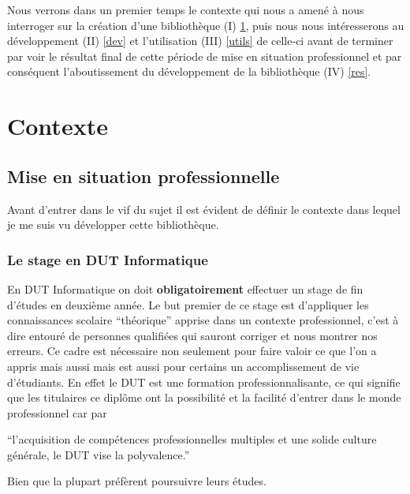 \documentclass[11pt,a4paper,krantz2,11pt,oneside]{krantz}
\renewenvironment{quote}{\begin{VF}}{\end{VF}}
\begin{document}
Nous verrons dans un premier temps le contexte qui nous a amené à nous interroger sur la création d'une bibliothèque (I) \ref{context}, puis nous nous intéresserons au développement (II) \ref{dev} et l'utilisation (III) \ref{utils} de celle-ci avant de terminer par voir le résultat final de cette période de mise en situation professionnel et par conséquent l'aboutissement du développement de la bibliothèque (IV) \ref{res}.

\hypertarget{context}{%
\chapter{Contexte}\label{context}}

\hypertarget{mise-en-situation-professionnelle}{%
\section{Mise en situation professionnelle}\label{mise-en-situation-professionnelle}}

Avant d'entrer dans le vif du sujet il est évident de définir le contexte dans lequel je me suis vu développer cette bibliothèque.

\hypertarget{le-stage-en-dut-informatique}{%
\subsection{Le stage en DUT Informatique}\label{le-stage-en-dut-informatique}}

En DUT Informatique on doit \textbf{obligatoirement} effectuer un stage de fin d'études en deuxième année. Le but premier de ce stage est d'appliquer les connaissances scolaire ``théorique'' apprise dans un contexte professionnel, c'est à dire entouré de personnes qualifiées qui sauront corriger et nous montrer nos erreurs. Ce cadre est nécessaire non seulement pour faire valoir ce que l'on a appris mais aussi mais est aussi pour certains un accomplissement de vie d'étudiants. En effet le DUT est une formation professionnalisante, ce qui signifie que les titulaires ce diplôme ont la possibilité et la facilité d'entrer dans le monde professionnel car par

\begin{quote}
``l'acquisition de compétences professionnelles multiples et une solide culture générale, le DUT vise la polyvalence.''
\end{quote}

\citep{onisep_dut}

Bien que la plupart préfèrent poursuivre leurs études.
\end{document}
